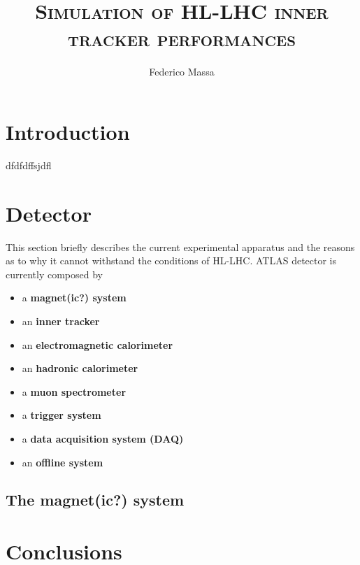 \documentclass[a4paper,12pt]{article}
\title{\textsc{Simulation of HL-LHC inner tracker performances}}
\author{Federico Massa}
\begin{document}

\maketitle

\tableofcontents
\newpage

\section{Introduction} \label{Introduction}

dfdfdffsjdfl

\newpage

\section{Detector} \label{Detector}

This section briefly describes the current experimental apparatus and the reasons as to why it cannot withstand the conditions of HL-LHC.
ATLAS detector is currently composed by 
\begin{itemize}
\item a \textbf{magnet(ic?) system}
\item an \textbf{inner tracker}
\item an \textbf{electromagnetic calorimeter}
\item an \textbf{hadronic calorimeter}
\item a \textbf{muon spectrometer}
\item a \textbf{trigger system}
\item a \textbf{data acquisition system (DAQ)}
\item an \textbf{offline system}
\end{itemize}

\subsection{The magnet(ic?) system}
\cite{magnetic_system}


\newpage
\section{Conclusions}
\label{Conclusions}
\baselineskip 25pt
\baselineskip 5pt
\baselineskip 16pt

\appendix




\end{document}
